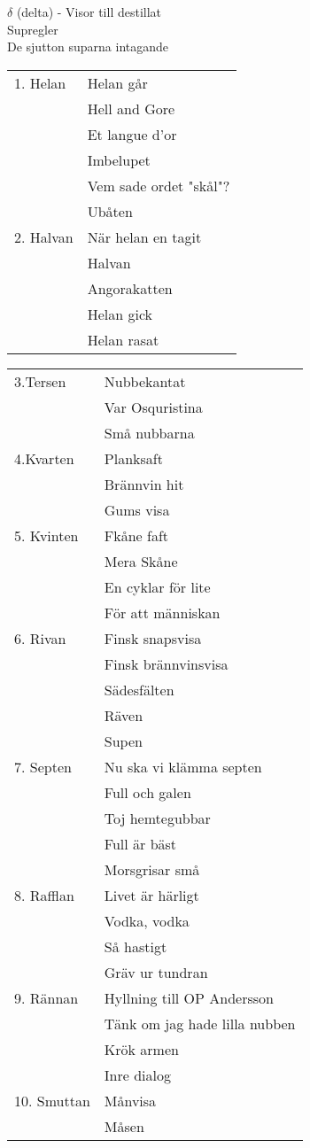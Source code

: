\documentclass[a6paper,10pt]{article}
\begin{document}
\noindent
\Large $\delta$ (delta) - Visor till destillat
\vspace{3pt}\\
\normalsize   Supregler
\vspace{3pt}\\
    De sjutton suparna intagande
\vspace{-7pt}
\begin{table}[!h]
\begin{tabularx}{0.8\textwidth}{l X}
1. Helan&Helan går\\
&Hell and Gore\\
&Et langue d'or\\
&Imbelupet\\
&Vem sade ordet "skål"?\\
&Ubåten\\
2. Halvan&När helan en tagit\\
&Halvan\\
&Angorakatten\\
&Helan gick\\
&Helan rasat\\
\end{tabularx}
\end{table}
\begin{table}[!h]
\begin{tabularx}{0.9\textwidth}{l X}
3.Tersen&Nubbekantat\\
 &Var Osquristina\\
 &Små nubbarna\\
4.Kvarten&Planksaft\\
 &Brännvin hit\\
 &Gums visa\\
5. Kvinten&Fkåne faft\\
 &Mera Skåne\\
 &En cyklar för lite\\
 &För att människan\\
6. Rivan&Finsk snapsvisa\\
 &Finsk brännvinsvisa\\
 &Sädesfälten\\
 &Räven\\
 &Supen\\
7. Septen&Nu ska vi klämma septen\\
 &Full och galen\\
 &Toj hemtegubbar\\
 &Full är bäst\\
 &Morsgrisar små\\
8. Rafflan&Livet är härligt\\
 &Vodka, vodka\\
 &Så hastigt\\
 &Gräv ur tundran\\
9. Rännan&Hyllning till OP Andersson\\
&Tänk om jag hade lilla nubben\\
&Krök armen\\
&Inre dialog\\
10. Smuttan&Månvisa\\
&Måsen
\end{tabularx}
\end{table}
\end{document}
